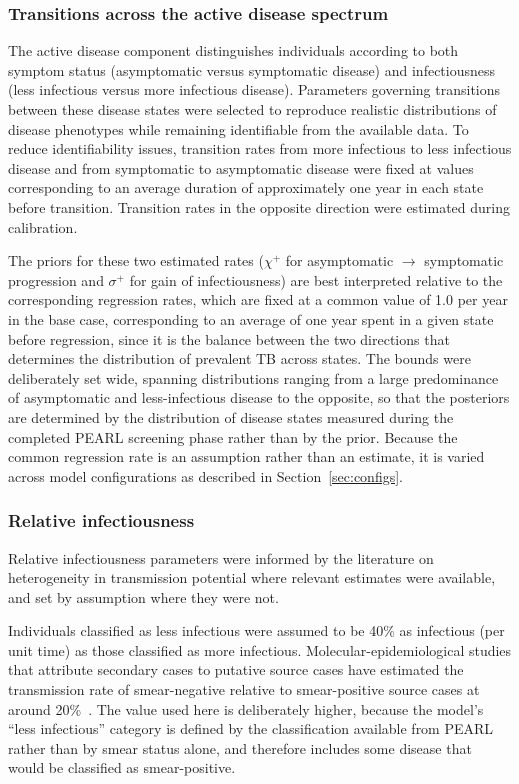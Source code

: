 \subsubsection{Transitions across the active disease spectrum}

The active disease component distinguishes individuals according to both symptom status (asymptomatic versus symptomatic disease) and infectiousness (less infectious versus more infectious disease). Parameters governing transitions between these disease states were selected to reproduce realistic distributions of disease phenotypes while remaining identifiable from the available data. To reduce identifiability issues, transition rates from more infectious to less infectious disease and from symptomatic to asymptomatic disease were fixed at values corresponding to an average duration of approximately one year in each state before transition. Transition rates in the opposite direction were estimated during calibration.

The priors for these two estimated rates (\(\chi^+\) for asymptomatic \(\to\) symptomatic progression and \(\sigma^+\) for gain of infectiousness) are best interpreted relative to the corresponding regression rates, which are fixed at a common value of 1.0 per year in the base case, corresponding to an average of one year spent in a given state before regression, since it is the balance between the two directions that determines the distribution of prevalent TB across states. The bounds were deliberately set wide, spanning distributions ranging from a large predominance of asymptomatic and less-infectious disease to the opposite, so that the posteriors are determined by the distribution of disease states measured during the completed PEARL screening phase rather than by the prior. Because the common regression rate is an assumption rather than an estimate, it is varied across model configurations as described in Section~\ref{sec:configs}.

\subsubsection{Relative infectiousness}

Relative infectiousness parameters were informed by the literature on heterogeneity in transmission potential where relevant estimates were available, and set by assumption where they were not.

Individuals classified as less infectious were assumed to be 40\% as infectious (per unit time) as those classified as more infectious. Molecular-epidemiological studies that attribute secondary cases to putative source cases have estimated the transmission rate of smear-negative relative to smear-positive source cases at around 20\%~\cite{behr1999,asadi2022,yang2015}. The value used here is deliberately higher, because the model's ``less infectious'' category is defined by the classification available from PEARL rather than by smear status alone, and therefore includes some disease that would be classified as smear-positive.

